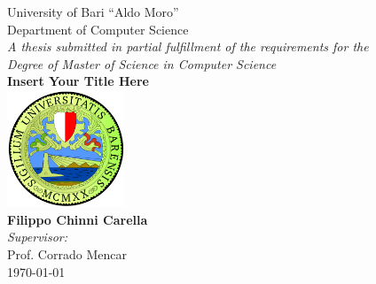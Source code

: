 \documentclass[12pt,twoside]{book}
\begin{document}

\frontmatter

\begin{titlepage}


\begin{center}
{\LARGE University of Bari ``Aldo Moro''}\\[0.25cm]
{\Large Department of Computer Science}\\[1cm]
{\large \emph{A thesis submitted in partial fulfillment of the requirements for the\\Degree of Master of Science in Computer Science}}\\[2.5cm]
\linespread{1.2}\huge {\bfseries Insert Your Title Here}\\[1.5cm]
\linespread{1}
\includegraphics[width=3.5cm]{images/uniba-logo.png}\\[1.5cm]
{\Large\bf Filippo Chinni Carella}\\[1cm]
\large \emph{Supervisor:}\\
Prof. Corrado Mencar\\[1cm] 
\vspace{\fill}
\today
\end{center}

\end{titlepage}


\end{document}
